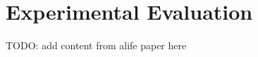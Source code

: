 \section{Experimental Evaluation} \label{sec:experimental-evaluation}

TODO: add content from alife paper here
